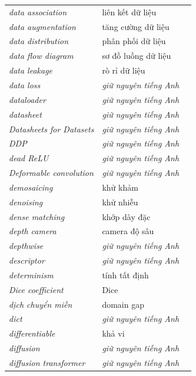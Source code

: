 \documentclass[deep_learning.tex]{subfiles}
\begin{document}
\begin{longtable}{@{}L{5.2cm}L{5.9cm}L{2.6cm}@{}}
\emph{data association} & liên kết dữ liệu & \\
\emph{data augmentation} & tăng cường dữ liệu & \\
\emph{data distribution} & phân phối dữ liệu & \\
\emph{data flow diagram} & sơ đồ luồng dữ liệu & \\
\emph{data leakage} & rò rỉ dữ liệu & \\
\emph{data loss} & \emph{\color{tiercol}giữ nguyên tiếng Anh} & \\
\emph{dataloader} & \emph{\color{tiercol}giữ nguyên tiếng Anh} & \\
\emph{datasheet} & \emph{\color{tiercol}giữ nguyên tiếng Anh} & \\
\emph{Datasheets for Datasets} & \emph{\color{tiercol}giữ nguyên tiếng Anh} & \\
\emph{DDP} & \emph{\color{tiercol}giữ nguyên tiếng Anh} & \\
\emph{dead ReLU} & \emph{\color{tiercol}giữ nguyên tiếng Anh} & \\
\emph{Deformable convolution} & \emph{\color{tiercol}giữ nguyên tiếng Anh} & \\
\emph{demosaicing} & khử khảm & \\
\emph{denoising} & khử nhiễu & \\
\emph{dense matching} & khớp dày đặc & \\
\emph{depth camera} & camera độ sâu & \\
\emph{depthwise} & \emph{\color{tiercol}giữ nguyên tiếng Anh} & \\
\emph{descriptor} & \emph{\color{tiercol}giữ nguyên tiếng Anh} & \\
\emph{determinism} & tính tất định & \\
\emph{Dice coefficient} & Dice & \\
\emph{dịch chuyển miền} & domain gap & \\
\emph{dict} & \emph{\color{tiercol}giữ nguyên tiếng Anh} & \\
\emph{differentiable} & khả vi & \\
\emph{diffusion} & \emph{\color{tiercol}giữ nguyên tiếng Anh} & \\
\emph{diffusion transformer} & \emph{\color{tiercol}giữ nguyên tiếng Anh} & \\

\end{longtable}
\end{document}
